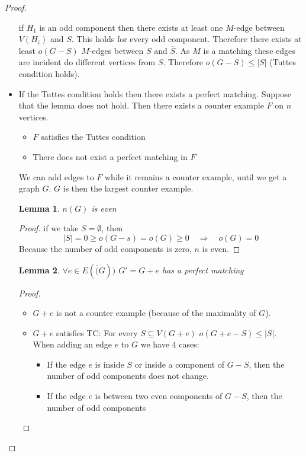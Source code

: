 \documentclass[notitlepage, 12pt]{article}
\newtheorem*{lemma}{Lemma}
\begin{document}
\begin{proof}
\begin{itemize}
    if $H_1$ is an odd component then there exists at least one $M$-edge between $V(H_i)$ and $S$.
    This holds for every odd component. Therefore there exists at least $o(G-S)$ $M$-edges
    between $S$ and $\overline{S}$. As $M$ is a matching these edges are incident do different
    vertices from $S$. Therefore $o(G-S) \leq |S|$ (Tuttes condition holds).
  
    \item[($\Leftarrow$)] If the Tuttes condition holds then there exists a perfect matching.
    Suppose that the lemma does not hold. Then there exists a counter example $F$ on $n$ vertices.
    \begin{itemize}
      \item[(1)] $F$ satisfies the Tuttes condition
      \item[(2)] There does not exist a perfect matching in $F$
    \end{itemize}
    We can add edges to $F$ while it remains a counter example, until we get a graph $G$. $G$ is then
    the largest counter example.
    \begin{lemma}
      $n(G)$ is even
    \end{lemma}
    \begin{proof}
      if we take $S = \emptyset$, then
      \[|S|=0 \geq o(G-s) = o(G) \geq 0 \quad \Rightarrow \quad o(G)=0\]
      Because the number of odd components is zero, $n$ is even.
    \end{proof}
    \begin{lemma}\MakeLinkTarget{}\label{proof-lemma:2}
      $\forall e \in E(\overline(G))$ $G'=G+e$ has a perfect matching
    \end{lemma}
    \begin{proof}
      \begin{itemize}
        \item $G+e$ is not a counter example (because of the maximality of $G$).
        \item $G+e$ satisfies TC:
        For every $S \subseteq V(G+e)$ $o(G+e-S) \leq |S|$.\\
        When adding an edge $e$ to $G$ we have 4 cases:
        \begin{itemize}
          \item[(a)] If the edge $e$ is inside $S$ or inside a component of $G-S$, then the number of
          odd components does not change.
          \item[(b)] If the edge $e$ is between two even components of $G-S$, then the number of odd components

\end{itemize}
\end{itemize}
\end{proof}
\end{itemize}
\end{proof}
\end{document}
